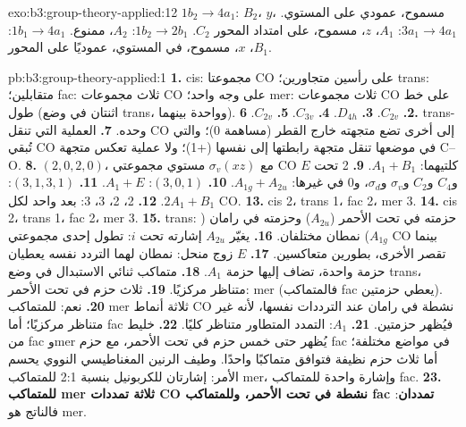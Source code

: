 \begin{solution}{exo:b3:group-theory-applied:12}
$1b_2 \to 4a_1$: $B_2$، $y$، مسموح، عمودي على المستوي. $3a_1 \to 4a_1$:
$A_1$، $z$، مسموح، على امتداد المحور $C_2$. $1b_2 \to 2b_1$: $A_2$، ممنوع.
$1b_1 \to 4a_1$: $B_1$، $x$، مسموح، في المستوي، عموديًا على المحور.
\end{solution}

\begin{solution}{pb:b3:group-theory-applied:1}
\textbf{1.} cis: مجموعتا CO على رأسين متجاورين؛ trans: متقابلين؛ fac: ثلاث
مجموعات CO على وجه واحد؛ mer: ثلاث مجموعات CO على خط طول (اثنتان في وضع trans، وواحدة بينهما).
\textbf{2.} $C_{2v}$.
\textbf{3.} $D_{4h}$.
\textbf{4.} $C_{3v}$.
\textbf{5.} $C_{2v}$.
\textbf{6.} trans- وحده.
\textbf{7.} العملية التي تنقل CO إلى أخرى تضع متجهته خارج
القطر (مساهمة 0)؛ والتي تُبقي CO في موضعها تنقل متجهة رابطتها
إلى نفسها (+1)؛ ولا عملية تعكس متجهة C--O.
\textbf{8.}  $(2, 0, 2, 0)$، مع $\sigma_v(xz)$ مستوي مجموعتي CO كلتيهما: $A_1 +
B_1$.
\textbf{9.}  2 تحت $E$ و$C_4$ و$C_2$ و$\sigma_v$ و$\sigma_d$، و0 في غيرها:
$A_{1g} + A_{2u}$.
\textbf{10.} $(3, 0, 1)$: $A_1 + E$.
\textbf{11.} $(3, 1, 3, 1)$: $2A_1 + B_1$.
\textbf{12.} 2، 2، 3، 3: بعد واحد لكل CO.
\textbf{13.} cis 2، trans 1، fac 2، mer 3.
\textbf{14.} cis 2، trans 1، fac 2، mer 3.
\textbf{15.} trans: حزمته في تحت الأحمر ($A_{2u}$) وحزمته في رامان ($A_{1g}$) نمطان
مختلفان.
\textbf{16.} يغيّر $A_{2u}$ إشارته تحت $i$: تطول إحدى مجموعتي CO بينما تقصر
الأخرى، بطورين متعاكسين.
\textbf{17.} $E$ زوج منحل: نمطان لهما التردد نفسه يعطيان
حزمة واحدة، تضاف إليها حزمة $A_1$.
\textbf{18.} متماكب ثنائي الاستبدال في وضع trans، متناظر مركزيًا.
\textbf{19.} ثلاث حزم في تحت الأحمر: mer (فالمتماكب fac يعطي حزمتين).
\textbf{20.} نعم: للمتماكب mer ثلاثة أنماط CO نشطة في رامان عند الترددات نفسها،
لأنه غير متناظر مركزيًا؛ أما fac فيُظهر حزمتين.
\textbf{21.} $A_1$: التمدد المتطاور متناظر كليًا.
\textbf{22.} خليط من fac وmer يُظهر حتى خمس حزم في تحت الأحمر، مع حزم fac
في مواضع مختلفة؛ أما ثلاث حزم نظيفة فتوافق متماكبًا واحدًا. وطيف
الرنين المغناطيسي النووي  يحسم الأمر: إشارتان للكربونيل بنسبة 2:1 للمتماكب
mer، وإشارة واحدة للمتماكب fac.
\textbf{23.} \textbf{للمتماكب mer ثلاثة تمددات CO نشطة في تحت الأحمر، وللمتماكب fac
تمددان}: فالناتج هو mer.
\end{solution}
